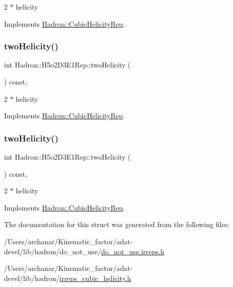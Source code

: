 2 $\ast$ helicity 

Implements \mbox{\hyperlink{structHadron_1_1CubicHelicityRep_af507aa56fc2747eacc8cb6c96db31ecc}{Hadron\+::\+Cubic\+Helicity\+Rep}}.

\mbox{\label{structHadron_1_1H5o2D3E1Rep_a27a2e169bad892e46433717d73c2a9ed}} 
\subsubsection{\texorpdfstring{twoHelicity()}{twoHelicity()}\hspace{0.1cm}{\footnotesize\ttfamily [2/3]}}
{\footnotesize\ttfamily int Hadron\+::\+H5o2\+D3\+E1\+Rep\+::two\+Helicity (\begin{DoxyParamCaption}{ }\end{DoxyParamCaption}) const\hspace{0.3cm}{\ttfamily [inline]}, {\ttfamily [virtual]}}

2 $\ast$ helicity 

Implements \mbox{\hyperlink{structHadron_1_1CubicHelicityRep_af507aa56fc2747eacc8cb6c96db31ecc}{Hadron\+::\+Cubic\+Helicity\+Rep}}.

\mbox{\label{structHadron_1_1H5o2D3E1Rep_a27a2e169bad892e46433717d73c2a9ed}} 
\subsubsection{\texorpdfstring{twoHelicity()}{twoHelicity()}\hspace{0.1cm}{\footnotesize\ttfamily [3/3]}}
{\footnotesize\ttfamily int Hadron\+::\+H5o2\+D3\+E1\+Rep\+::two\+Helicity (\begin{DoxyParamCaption}{ }\end{DoxyParamCaption}) const\hspace{0.3cm}{\ttfamily [inline]}, {\ttfamily [virtual]}}

2 $\ast$ helicity 

Implements \mbox{\hyperlink{structHadron_1_1CubicHelicityRep_af507aa56fc2747eacc8cb6c96db31ecc}{Hadron\+::\+Cubic\+Helicity\+Rep}}.



The documentation for this struct was generated from the following files\+:\begin{DoxyCompactItemize}
\item 
/\+Users/archanar/\+Kinematic\+\_\+factor/adat-\/devel/lib/hadron/do\+\_\+not\+\_\+use/\mbox{\hyperlink{adat-devel_2lib_2hadron_2do__not__use_2do__not__use_8irreps_8h}{do\+\_\+not\+\_\+use.\+irreps.\+h}}\item 
/\+Users/archanar/\+Kinematic\+\_\+factor/adat-\/devel/lib/hadron/\mbox{\hyperlink{adat-devel_2lib_2hadron_2irreps__cubic__helicity_8h}{irreps\+\_\+cubic\+\_\+helicity.\+h}}\end{DoxyCompactItemize}
